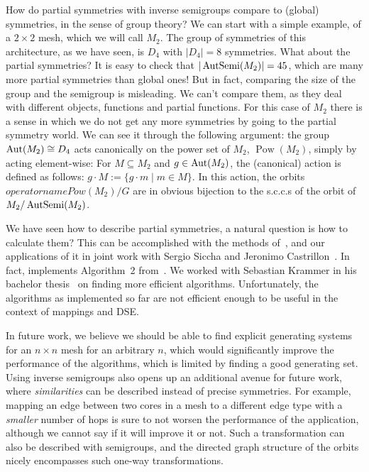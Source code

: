 How do partial symmetries with inverse semigroups compare to (global) symmetries, in the sense of group theory?
We can start with a simple example, of a $2\times 2$ mesh, which we will call $M_2$. The group of symmetries of this architecture, as we have seen, is $D_4$ with $|D_4| = 8$ symmetries.
What about the partial symmetries? It is easy to check that $|\operatorname{AutSemi}(M_2)| = 45$, which are many more partial symmetries than global ones! But in fact, comparing the size of the group and the semigroup is misleading.
We can't compare them, as they deal with different objects, functions and partial functions.
For this case of $M_2$ there is a sense in which we do not get any more symmetries by going to the partial symmetry world.
We can see it through the following argument: the group $\operatorname{Aut}(M_2) \cong D_4$ acts canonically on the power set of $M_2$, $\operatorname{Pow}(M_2)$, simply by acting element-wise:
For $M \subseteq M_2$ and $g \in \operatorname{Aut}(M_2)$, the (canonical) action is defined as follows: $g \cdot M := \{ g \cdot m \mid m \in M \}$.
In this action, the orbits $operatorname{Pow}(M_2) / G$ are in obvious bijection to the \acp{s.c.c.} of the orbit of $M_2 / \operatorname{AutSemi}(M_2) $.

We have seen how to describe partial symmetries, a natural question is how to calculate them?
This can be accomplished with the methods of~\cite{east2019semigroups}, and our applications of it in joint work with Sergio Siccha and Jeronimo Castrillon~\cite{goens_taco17}.
In fact, \mpsym implements Algorithm~2 from~\cite{goens_taco17}.
We worked with Sebastian Krammer in his bachelor thesis~\cite{krammer_bachelor} on finding more efficient algorithms. 
Unfortunately, the algorithms as implemented so far are not efficient enough to be useful in the context of mappings and \ac{DSE}.

In future work, we believe we should be able to find explicit generating systems for an $n \times n$ mesh for an arbitrary $n$, which would significantly improve the performance of the algorithms, which is limited by finding a good generating set.
Using inverse semigroups also opens up an additional avenue for future work, where \emph{similarities} can be described instead of precise symmetries. 
For example, mapping an edge between two cores in a mesh to a different edge type with a \emph{smaller} number of hops is sure to not worsen the performance of the application, although we cannot say if it will improve it or not.
Such a transformation can also be described with semigroups, and the directed graph structure of the orbits nicely encompasses such one-way transformations.
